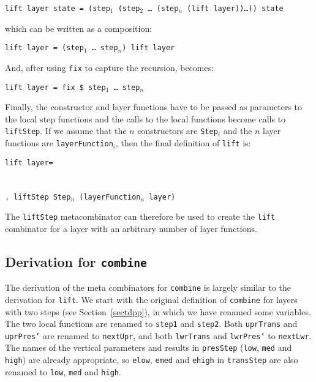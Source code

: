 \begin{tabbing}
{\tt l}\={\tt ift layer state = (step$_1$ (step$_2$ \dots ~(step$_n$ (lift layer))\dots)) state}\\
\end{tabbing}

which can be written as a composition:

\begin{tabbing}
{\tt l}\={\tt ift layer = (step$_1$ \dots ~step$_n$) lift layer}\\
\end{tabbing}

And, after using \texttt{fix} to capture the recursion, becomes:

\begin{tabbing}
{\tt l}\={\tt ift layer = fix \$ step$_1$ \dots ~step$_n$}\\
\end{tabbing}

Finally, the constructor and layer functions have to be passed as parameters to the local step functions and the calls to the local functions become calls to \texttt{liftStep}. If we assume that the $n$ constructors are \texttt{Step$_i$} and the $n$ layer functions are \texttt{layerFunction$_i$}, then the final definition of \texttt{lift} is:\begin{tabbing}
{\tt li}\={\tt ft l}\={\tt ayer= }\\
\\
\>\\ 
\>\>\verb|. lift|{\tt Step Step$_n$ (layerFunction$_n$ layer)}
\end{tabbing}

The \texttt{liftStep} metacombinator can therefore be used to create the \texttt{lift} combinator for a layer with an arbitrary number of layer functions.


\subsection{Derivation for \texttt{combine}} \label{subsubsectcombine}

The derivation of the meta combinators for \texttt{combine} is largely similar to the derivation for \texttt{lift}. We start with the original definition of \texttt{combine} for layers with two steps (see Section~\ref{sectdpp}), in which we have renamed some variables. The two local functions are renamed to \texttt{step1} and \texttt{step2}. Both \texttt{uprTrans} and \texttt{uprPres'} are renamed to \texttt{nextUpr}, and both \texttt{lwrTrans} and \texttt{lwrPres'} to \texttt{nextLwr}. The names of the vertical parameters and results in \texttt{presStep} (\texttt{low}, \texttt{med} and \texttt{high}) are already appropriate, so \texttt{elow}, \texttt{emed} and \texttt{ehigh} in \texttt{transStep} are also renamed to \texttt{low}, \texttt{med} and \texttt{high}.

